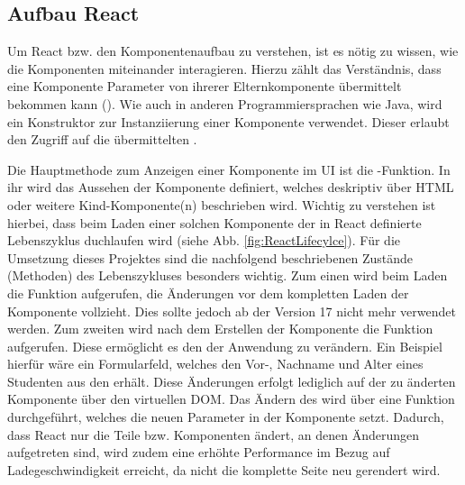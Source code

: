 
\subsection{Aufbau React}
\label{ssec:AufbauReact}

Um React bzw. den Komponentenaufbau zu verstehen, ist es nötig zu wissen, wie die Komponenten miteinander interagieren.
Hierzu zählt \ua das Verständnis, dass eine Komponente Parameter von ihrerer Elternkomponente übermittelt bekommen kann (\props).
Wie auch in anderen Programmiersprachen wie \zb Java, wird ein Konstruktor  zur Instanziierung einer Komponente verwendet.
Dieser erlaubt den Zugriff auf die übermittelten \props.

Die Hauptmethode zum Anzeigen einer Komponente im \ac{UI} ist die \render-Funktion.
In ihr wird das Aussehen der Komponente definiert, welches deskriptiv über \acs{HTML} oder weitere Kind-Kompo\-nente(n) beschrieben wird.
Wichtig zu verstehen ist hierbei, dass beim Laden einer solchen Komponente der in React definierte Lebenszyklus duchlaufen wird (siehe Abb. \ref{fig:ReactLifecylce}).
Für die Umsetzung dieses Projektes sind die nachfolgend beschriebenen Zustände (Methoden) des Lebenszykluses besonders wichtig.
Zum einen wird beim Laden die Funktion \cwm aufgerufen, die Änderungen vor dem kompletten Laden der Komponente vollzieht.
Dies sollte jedoch ab der Version 17 nicht mehr verwendet werden.
Zum zweiten wird nach dem Erstellen der Komponente die Funktion \cdm aufgerufen.
Diese ermöglicht es \zb den \state  der Anwendung zu verändern.
Ein Beispiel hierfür wäre ein Formularfeld, welches den Vor-, Nachname und Alter eines Studenten aus den \props erhält.
Diese Änderungen erfolgt lediglich auf der zu änderten Komponente über den virtuellen \ac{DOM}.
Das Ändern des \state wird über eine Funktion \exampleState durchgeführt, welches die neuen Parameter in der Komponente setzt.
Dadurch, dass React nur die Teile bzw. Komponenten ändert, an denen Änderungen aufgetreten sind, wird zudem eine erhöhte Performance im Bezug auf Ladegeschwindigkeit erreicht, da nicht die komplette Seite neu gerendert wird.

